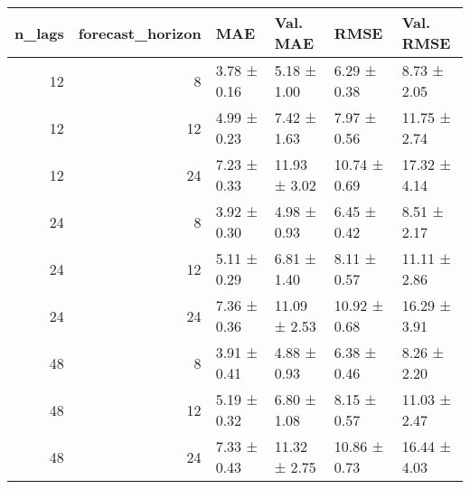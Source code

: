 \begin{tabular}{rrllll}
\toprule
n_lags & forecast_horizon & MAE & Val. MAE & RMSE & Val. RMSE \\
\midrule
12 & 8 & 3.78 ± 0.16 & 5.18 ± 1.00 & 6.29 ± 0.38 & 8.73 ± 2.05 \\
12 & 12 & 4.99 ± 0.23 & 7.42 ± 1.63 & 7.97 ± 0.56 & 11.75 ± 2.74 \\
12 & 24 & 7.23 ± 0.33 & 11.93 ± 3.02 & 10.74 ± 0.69 & 17.32 ± 4.14 \\
24 & 8 & 3.92 ± 0.30 & 4.98 ± 0.93 & 6.45 ± 0.42 & 8.51 ± 2.17 \\
24 & 12 & 5.11 ± 0.29 & 6.81 ± 1.40 & 8.11 ± 0.57 & 11.11 ± 2.86 \\
24 & 24 & 7.36 ± 0.36 & 11.09 ± 2.53 & 10.92 ± 0.68 & 16.29 ± 3.91 \\
48 & 8 & 3.91 ± 0.41 & 4.88 ± 0.93 & 6.38 ± 0.46 & 8.26 ± 2.20 \\
48 & 12 & 5.19 ± 0.32 & 6.80 ± 1.08 & 8.15 ± 0.57 & 11.03 ± 2.47 \\
48 & 24 & 7.33 ± 0.43 & 11.32 ± 2.75 & 10.86 ± 0.73 & 16.44 ± 4.03 \\
\bottomrule
\end{tabular}
